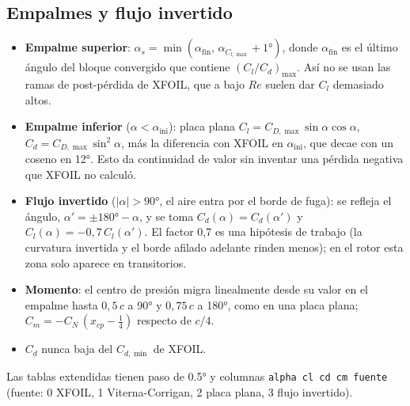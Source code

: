 \subsection{Empalmes y flujo invertido}
\begin{itemize}
  \item \textbf{Empalme superior}: $\alpha_s=\min(\alpha_{\text{fin}},\,\alpha_{C_{l,\max}}+\ang{1})$,
        donde $\alpha_{\text{fin}}$ es el último ángulo del bloque convergido que contiene
        $(C_l/C_d)_{\max}$. Así no se usan las ramas de post-pérdida de XFOIL, que a bajo
        $Re$ suelen dar $C_l$ demasiado altos.
  \item \textbf{Empalme inferior} ($\alpha<\alpha_{\text{ini}}$): placa plana
        $C_l=C_{D,\max}\sin\alpha\cos\alpha$, $C_d=C_{D,\max}\sin^2\alpha$, más la
        diferencia con XFOIL en $\alpha_{\text{ini}}$, que decae con un coseno en
        \ang{12}. Esto da continuidad de valor sin inventar una pérdida negativa que XFOIL
        no calculó.
  \item \textbf{Flujo invertido} ($|\alpha|>\ang{90}$, el aire entra por el borde de
        fuga): se refleja el ángulo, $\alpha'=\pm\ang{180}-\alpha$, y se toma
        $C_d(\alpha)=C_d(\alpha')$ y $C_l(\alpha)=-0{,}7\,C_l(\alpha')$. El factor 0,7 es
        una hipótesis de trabajo (la curvatura invertida y el borde afilado adelante
        rinden menos); en el rotor esta zona solo aparece en transitorios.
  \item \textbf{Momento}: el centro de presión migra linealmente desde su valor en el
        empalme hasta $0{,}5\,c$ a \ang{90} y $0{,}75\,c$ a \ang{180}, como en una placa
        plana; $C_m=-C_N\,(x_{cp}-\tfrac14)$ respecto de $c/4$.
  \item $C_d$ nunca baja del $C_{d,\min}$ de XFOIL.
\end{itemize}
Las tablas extendidas tienen paso de \ang{0.5} y columnas \texttt{alpha cl cd cm fuente}
(fuente: 0 XFOIL, 1 Viterna-Corrigan, 2 placa plana, 3 flujo invertido).

